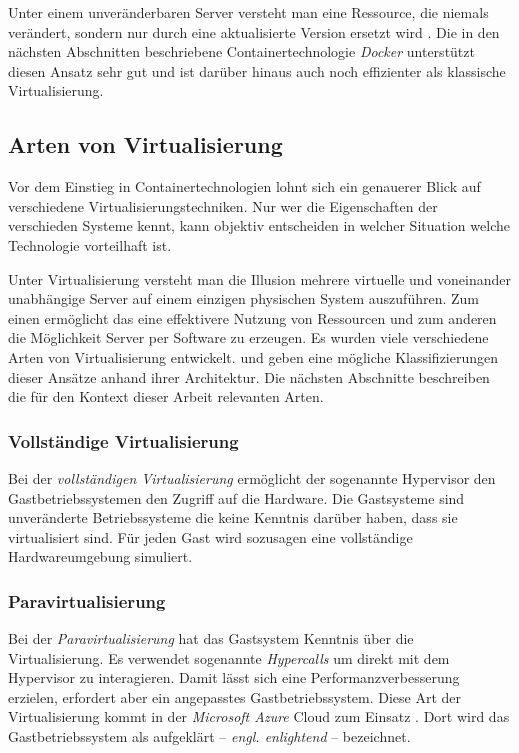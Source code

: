 Unter einem unveränderbaren Server versteht man eine Ressource, die niemals verändert, sondern nur durch eine aktualisierte Version ersetzt wird \cite{ImmutableServer}. Die in den nächsten Abschnitten beschriebene Containertechnologie \textit{Docker} unterstützt diesen Ansatz sehr gut und ist darüber hinaus auch noch effizienter als klassische Virtualisierung.

\subsection{Arten von Virtualisierung}

Vor dem Einstieg in Containertechnologien lohnt sich ein genauerer Blick auf verschiedene Virtualisierungstechniken. Nur wer die Eigenschaften der verschieden Systeme kennt, kann objektiv entscheiden in welcher Situation welche Technologie vorteilhaft ist.

Unter Virtualisierung versteht man die Illusion mehrere virtuelle und voneinander unabhängige Server auf einem einzigen physischen System auszuführen. Zum einen ermöglicht das eine effektivere Nutzung von Ressourcen und zum anderen die Möglichkeit Server per Software zu erzeugen. Es wurden viele verschiedene Arten von Virtualisierung entwickelt. \cite{VirtualizationBasics} und \cite{Smith:2005:AVM:1069588.1069632} geben eine mögliche Klassifizierungen dieser Ansätze anhand ihrer Architektur. Die nächsten Abschnitte beschreiben die für den Kontext dieser Arbeit relevanten Arten.

\subsubsection{Vollständige Virtualisierung}

Bei der \textit{vollständigen Virtualisierung} ermöglicht der sogenannte Hypervisor den Gastbetriebssystemen den Zugriff auf die Hardware. Die Gastsysteme sind unveränderte Betriebssysteme die keine Kenntnis darüber haben, dass sie virtualisiert sind. Für jeden Gast wird sozusagen eine vollständige Hardwareumgebung simuliert.

\subsubsection{Paravirtualisierung}

Bei der \textit{Paravirtualisierung} hat das Gastsystem Kenntnis über die Virtualisierung. Es verwendet sogenannte \textit{Hypercalls} um direkt mit dem Hypervisor zu interagieren. Damit lässt sich eine Performanzverbesserung erzielen, erfordert aber ein angepasstes Gastbetriebssystem. Diese Art der Virtualisierung kommt \zB in der \textit{Microsoft Azure} Cloud zum Einsatz \cite[30]{Krishnan10}. Dort wird das Gastbetriebssystem als aufgeklärt -- \textit{engl. enlightend} -- bezeichnet.

